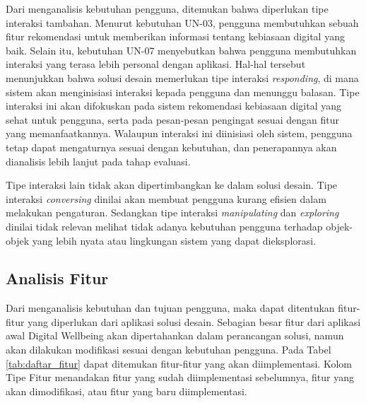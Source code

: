 Dari menganalisis kebutuhan pengguna, ditemukan bahwa diperlukan tipe interaksi tambahan. Menurut kebutuhan UN-03, pengguna membutuhkan sebuah fitur rekomendasi untuk memberikan informasi tentang kebiasaan digital yang baik. Selain itu, kebutuhan UN-07 menyebutkan bahwa pengguna membutuhkan interaksi yang terasa lebih personal dengan aplikasi. Hal-hal tersebut menunjukkan bahwa solusi desain memerlukan tipe interaksi \textit{responding}, di mana sistem akan menginisiasi interaksi kepada pengguna dan menunggu balasan. Tipe interaksi ini akan difokuskan pada sistem rekomendasi kebiasaan digital yang sehat untuk pengguna, serta pada pesan-pesan pengingat sesuai dengan fitur yang memanfaatkannya. Walaupun interaksi ini diinisiasi oleh sistem, pengguna tetap dapat mengaturnya sesuai dengan kebutuhan, dan penerapannya akan dianalisis lebih lanjut pada tahap evaluasi.

Tipe interaksi lain tidak akan dipertimbangkan ke dalam solusi desain. Tipe interaksi \textit{conversing} dinilai akan membuat pengguna kurang efisien dalam melakukan pengaturan. Sedangkan tipe interaksi \textit{manipulating} dan \textit{exploring} dinilai tidak relevan melihat tidak adanya kebutuhan pengguna terhadap objek-objek yang lebih nyata atau lingkungan sistem yang dapat dieksplorasi.


\subsection{Analisis Fitur}
\label{subsec:analisis_fitur}

Dari menganalisis kebutuhan dan tujuan pengguna, maka dapat ditentukan fitur-fitur yang diperlukan dari aplikasi solusi desain. Sebagian besar fitur dari aplikasi awal Digital Wellbeing akan dipertahankan dalam perancangan solusi, namun akan dilakukan modifikasi sesuai dengan kebutuhan pengguna. Pada Tabel \ref{tab:daftar_fitur} dapat ditemukan fitur-fitur yang akan diimplementasi. Kolom Tipe Fitur menandakan fitur yang sudah diimplementasi sebelumnya, fitur yang akan dimodifikasi, atau fitur yang baru diimplementasi. 

